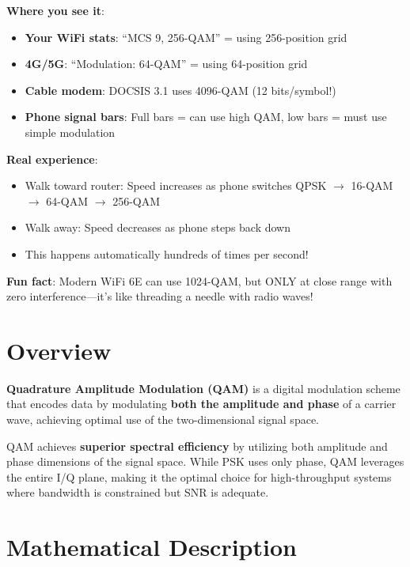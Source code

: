 \begin{nontechnical}
\textbf{Where you see it}:
\begin{itemize}
\item \textbf{Your WiFi stats}: ``MCS 9, 256-QAM'' = using 256-position grid
\item \textbf{4G/5G}: ``Modulation: 64-QAM'' = using 64-position grid
\item \textbf{Cable modem}: DOCSIS 3.1 uses 4096-QAM (12 bits/symbol!)
\item \textbf{Phone signal bars}: Full bars = can use high QAM, low bars = must use simple modulation
\end{itemize}

\textbf{Real experience}:
\begin{itemize}
\item Walk toward router: Speed increases as phone switches QPSK $\rightarrow$ 16-QAM $\rightarrow$ 64-QAM $\rightarrow$ 256-QAM
\item Walk away: Speed decreases as phone steps back down
\item This happens automatically hundreds of times per second!
\end{itemize}

\textbf{Fun fact}: Modern WiFi 6E can use 1024-QAM, but ONLY at close
range with zero interference---it's like threading a needle with radio waves!
\end{nontechnical}

\section{Overview}

\textbf{Quadrature Amplitude Modulation (QAM)} is a digital modulation scheme that encodes data by modulating \textbf{both the amplitude and phase} of a carrier wave, achieving optimal use of the two-dimensional signal space.

\begin{keyconcept}
QAM achieves \textbf{superior spectral efficiency} by utilizing both amplitude and phase dimensions of the signal space. While PSK uses only phase, QAM leverages the entire I/Q plane, making it the optimal choice for high-throughput systems where bandwidth is constrained but SNR is adequate.
\end{keyconcept}

\section{Mathematical Description}

